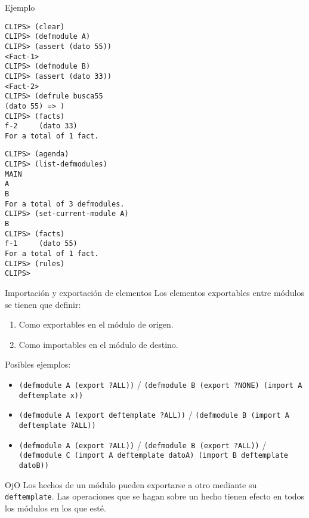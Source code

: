 \documentclass[usenames,dvipsnames,aspectratio=169]{beamer}
\begin{document}
\begin{frame}[fragile]{Ejemplo}
	\begin{minipage}[t]{0.47\textwidth}
		\begin{verbatim}
CLIPS> (clear)
CLIPS> (defmodule A)
CLIPS> (assert (dato 55))
<Fact-1>
CLIPS> (defmodule B)
CLIPS> (assert (dato 33))
<Fact-2>
CLIPS> (defrule busca55
(dato 55) => )
CLIPS> (facts)
f-2     (dato 33)
For a total of 1 fact.
		\end{verbatim}
	\end{minipage}
	\hfill
	\begin{minipage}[t]{0.47\textwidth}
		\begin{verbatim}
CLIPS> (agenda)
CLIPS> (list-defmodules)
MAIN
A
B
For a total of 3 defmodules.
CLIPS> (set-current-module A)
B
CLIPS> (facts)
f-1     (dato 55)
For a total of 1 fact.
CLIPS> (rules)
CLIPS> 
		\end{verbatim}
	\end{minipage}
\end{frame}

\begin{frame}{Importación y exportación de elementos}
	Los elementos exportables entre módulos se tienen que definir:
	\begin{enumerate}\small
		\item Como exportables en el módulo de origen.
		\item Como importables en el módulo de destino.
	\end{enumerate}
	Posibles ejemplos:
	\begin{itemize}\footnotesize
		\item \texttt{(defmodule A (export ?ALL))} / \texttt{(defmodule B (export ?NONE) (import A deftemplate x))}
		\item \texttt{(defmodule A (export deftemplate ?ALL))} / \texttt{(defmodule B (import A deftemplate ?ALL))}
		\item \texttt{(defmodule A (export ?ALL))} / \texttt{(defmodule B (export ?ALL))} / \texttt{(defmodule C (import A deftemplate datoA) (import B deftemplate datoB))}
	\end{itemize}
	\begin{block}{OjO}
		Los hechos de un módulo pueden exportarse a otro mediante su \texttt{deftemplate}. Las operaciones que se hagan sobre un hecho tienen efecto en todos los módulos en los que esté.
	\end{block}
\end{frame}
\end{document}
